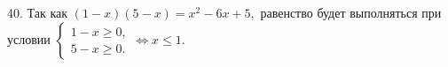 40. Так как $(1-x)(5-x)=x^2-6x+5,$ равенство будет выполняться при условии $\begin{cases}1-x\geqslant0,\\ 5-x\geqslant0.\end{cases}\Leftrightarrow x\leqslant1.$\\
